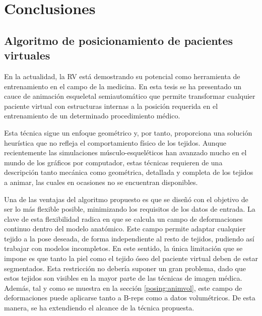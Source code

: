 \chapter{Conclusiones}
\label{cap:conclu}

\section{Algoritmo de posicionamiento de pacientes virtuales}
\label{conclu:posing}

En la actualidad, la \ac{RV} está demostrando su potencial como herramienta de entrenamiento en el campo de la medicina. %
En esta tesis se ha presentado un cauce de animación esqueletal semiautomático que permite transformar cualquier paciente virtual con estructuras internas a la posición requerida en el entrenamiento de un determinado procedimiento médico.

Esta técnica sigue un enfoque geométrico y, por tanto, proporciona una solución heurística que no refleja  el comportamiento físico de los tejidos. Aunque recientemente las simulaciones músculo-esqueléticos han avanzado mucho en el mundo de los gráficos por computador, estas técnicas requieren de una descripción tanto mecánica como geométrica, detallada y completa de los tejidos a animar, las cuales en ocasiones no se encuentran disponibles. 

Una de las ventajas del algoritmo propuesto es que se diseñó con el objetivo de ser lo más flexible posible, minimizando los requisitos de los datos de entrada. La clave de esta flexibilidad radica en que se calcula un campo de deformaciones continuo dentro del modelo anatómico. Este campo permite adaptar cualquier tejido a la pose deseada, de forma independiente al resto de tejidos, pudiendo así trabajar con modelos incompletos. En este sentido, la única limitación que se impone es que tanto la piel como el tejido óseo del paciente virtual deben de estar segmentados. Esta restricción no debería suponer un gran problema, dado que estos tejidos son visibles en la mayor parte de las técnicas de imagen médica. Además, tal y como se muestra en la sección \ref{posing:animvol}, este campo de deformaciones puede aplicarse tanto a \acs{B-rep}s como a datos volumétricos. De esta manera, se ha extendiendo el alcance de la técnica propuesta.

